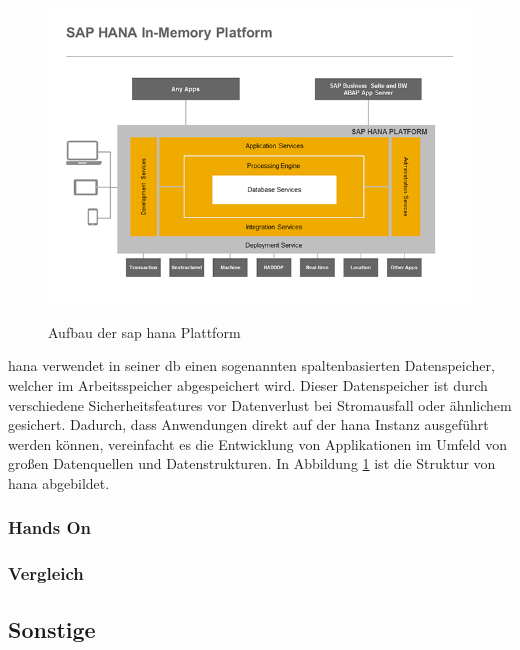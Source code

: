 \begin{figure}[H]
	\begin{center}
	\includegraphics[width=1\linewidth]{grafiken/hana-features-overview.png}
	\vspace{-20pt}
	\caption{Aufbau der \gls{sap} \gls{hana} Plattform \cite{SAPHanaAbout}}
	\vspace{-10pt}
	\label{abb:SAPHanaAbout}
	\end{center}
\end{figure}

\gls{hana} verwendet in seiner \gls{db} einen sogenannten spaltenbasierten Datenspeicher, welcher im Arbeitsspeicher abgespeichert wird. Dieser Datenspeicher ist durch verschiedene Sicherheitsfeatures vor Datenverlust bei Stromausfall oder ähnlichem gesichert.
Dadurch, dass Anwendungen direkt auf der \gls{hana} Instanz ausgeführt werden können, vereinfacht es die Entwicklung von Applikationen im Umfeld von großen Datenquellen und Datenstrukturen. In Abbildung \ref{abb:SAPHanaAbout} ist die Struktur von \gls{hana} abgebildet.

\subsubsection{Hands On}
\label{sec:db-hana-ho}

\subsubsection{Vergleich}
\label{sec:db-hana-vgl}

\subsection{Sonstige}
\label{sec:db-sonstige}
